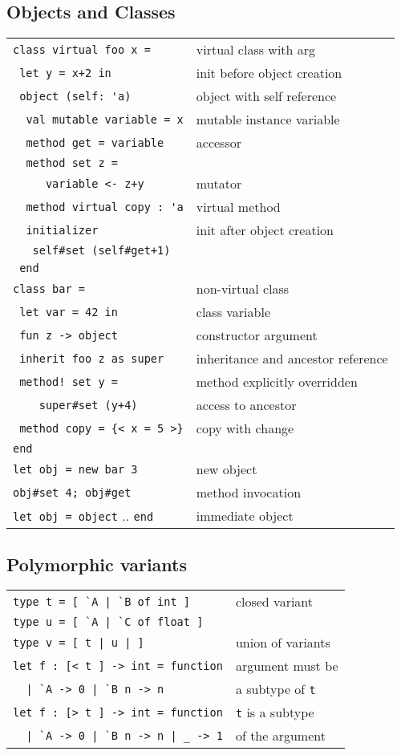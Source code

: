 \documentclass[10pt,landscape]{article}
\begin{document}
\begin{multicols}{3}
\subsection{Objects and Classes}

\begin{tabular}{ll}
\verb!class virtual foo x = !& virtual class with arg \\
\verb! let y = x+2 in! & init before object creation\\
\verb! object (self: 'a)! & object with self reference\\
\verb!  val mutable variable = x! & mutable instance variable \\
\verb!  method get = variable! & accessor \\
\verb!  method set z =!\\
\verb!     variable <- z+y! & mutator\\
\verb!  method virtual copy : 'a! & virtual method\\
\verb!  initializer! & init after object creation\\
\verb!   self#set (self#get+1)!& \\
\verb! end! &  \\
\verb!class bar = !&  non-virtual class\\
\verb! let var = 42 in! & class variable\\
\verb! fun z -> object! & constructor argument \\
\verb& inherit foo z as super& & inheritance and ancestor reference\\
\verb& method! set y =& & method explicitly overridden\\
\verb!    super#set (y+4)! & access to ancestor \\
\verb! method copy = {< x = 5 >}! & copy with change \\
\verb!end! & \\
\verb!let obj = new bar 3! & new object \\
\verb!obj#set 4; obj#get!  & method invocation \\
\verb!let obj = object! .. \verb!end! & immediate object \
\end{tabular}

\subsection{Polymorphic variants}


\begin{tabular}{ll}
\verb!type t = [ `A | `B of int ]! & closed variant \\
\verb!type u = [ `A | `C of float ]! & \\
\verb!type v = [ t | u | ]! & union of variants \\
\verb!let f : [< t ] -> int = function! & argument must be\\
\verb!  | `A -> 0 | `B n -> n! & \hfill a subtype of \verb!t!\\
\verb!let f : [> t ] -> int = function! & \verb!t! is a subtype \\
\verb!  | `A -> 0 | `B n -> n | _ -> 1! & \hfill of the argument \\
\end{tabular}

\end{multicols}
\end{document}
